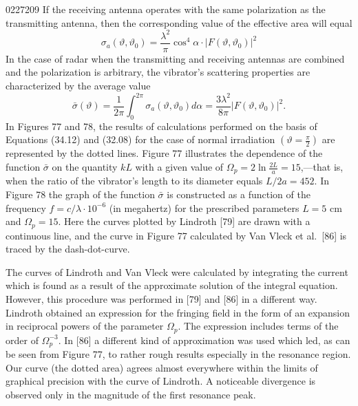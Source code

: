 \begin{scanpage}{0227}{209}
If the receiving antenna operates with the same polarization as the transmitting antenna, then the corresponding value of the effective area will equal
\[\sigma_a(\vartheta,\vartheta_0)=\frac{\lambda^2}\pi\cos^4\alpha\cdot|F(\vartheta,\vartheta_0)|^2\tag{34.11}\]
In the case of radar when the transmitting and receiving antennas are combined and the polarization is arbitrary, the vibrator's scattering properties are characterized by the average value
\[\bar\sigma(\vartheta)=\frac1{2\pi}\int_0^{2\pi}\sigma_a(\vartheta,\vartheta_0)d\alpha=\frac{3\lambda^2}{8\pi}|F(\vartheta,\vartheta_0)|^2.\tag{34.12}\]
In Figures 77 and 78, the results of calculations performed on the basis of Equations (34.12) and (32.08) for the case of normal irradiation $\left(\vartheta=\frac\pi2\right)$ are represented by the dotted lines. Figure 77 illustrates the dependence of the function $\bar\sigma$ on the quantity $kL$ with a given value of $\Omega_p=2\ln\frac{2L}a=15$,---that is, when the ratio of the vibrator's length to its diameter equals $L/2a=452$. In Figure 78 the graph of the function $\bar\sigma$ is constructed as a function of the frequency $f=c/\lambda\cdot10^{-6}$ (in megahertz) for the prescribed parameters $L=5$ cm and $\Omega_p=15$. Here the curves plotted by Lindroth [79] are drawn with a continuous line, and the curve in Figure 77 calculated by Van Vleck et al.\ [86] is traced by the dash-dot-curve.

The curves of Lindroth and Van Vleck were calculated by integrating the current which is found as a result of the approximate solution of the integral equation. However, this procedure was performed in [79] and [86] in a different way. Lindroth obtained an expression for the fringing field in the form of an expansion in reciprocal powers of the parameter $\Omega_p$. The expression includes terms of the order of $\Omega_p^{-3}$. In [86] a different kind of approximation was used which led, as can be seen from Figure 77, to rather rough results especially in the resonance region. Our curve (the dotted area) agrees almost everywhere within the limits of graphical precision with the curve of Lindroth. A noticeable divergence is observed only in the magnitude of the first resonance peak.
\end{scanpage}

